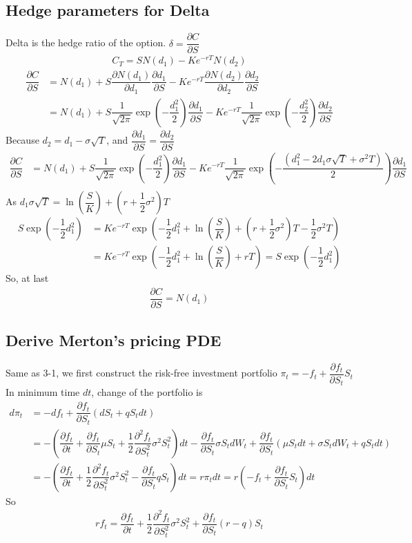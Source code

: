 \documentclass[12pt]{article}
\newcommand{\pfpt}{\dfrac{\partial f_t}{\partial t}}
\newcommand{\pfps}{\dfrac{\partial f_t}{\partial S_t}}
\newcommand{\pffpss}{\dfrac{\partial^2 f_t}{\partial S_t^2}}
\begin{document}
\subsection*{Hedge parameters for Delta}
Delta is the hedge ratio of the option. $\delta = \dfrac{\partial C}{\partial S}$
\begin{align*}
    C_T = S N(d_1) - Ke^{-rT}N(d_2) 
\end{align*}
\begin{align*}
    \dfrac{\partial C}{\partial S} & = N(d_1) + S\dfrac{\partial N(d_1)}{\partial d_1}\dfrac{\partial d_1}{\partial S} - Ke^{-rT}\dfrac{\partial N(d_2)}{\partial d_2}\dfrac{\partial d_2}{\partial S}\\
    & = N(d_1) + S\dfrac{1}{\sqrt{2\pi}}\exp(-\dfrac{d_1^2}{2})\dfrac{\partial d_1}{\partial S} - Ke^{-rT}\dfrac{1}{\sqrt{2\pi}}\exp(-\dfrac{d_2^2}{2})\dfrac{\partial d_2}{\partial S}
\end{align*}
Because $d_2 = d_1 - \sigma\sqrt{T}$, and $\dfrac{\partial d_1}{\partial S} = \dfrac{\partial d_2}{\partial S}$
\begin{align*}
    \dfrac{\partial C}{\partial S} & = N(d_1) + S\dfrac{1}{\sqrt{2\pi}}\exp(-\dfrac{d_1^2}{2})\dfrac{\partial d_1}{\partial S} - Ke^{-rT}\dfrac{1}{\sqrt{2\pi}}\exp(-\dfrac{(d_1^2 - 2d_1 \sigma\sqrt{T} + \sigma^2 T)}{2})\dfrac{\partial d_1}{\partial S}\\
\end{align*}
As $d_1\sigma\sqrt{T} = \ln(\dfrac{S}{K})+(r+\dfrac{1}{2}\sigma^2)T$
\begin{align*}
    S\exp(-\dfrac{1}{2}d_1^2) &= Ke^{-rT}\exp(-\dfrac{1}{2}d_1^2 + \ln(\dfrac{S}{K})+(r+\dfrac{1}{2}\sigma^2)T - \dfrac{1}{2}\sigma^2T)\\
    & = Ke^{-rT}\exp(-\dfrac{1}{2}d_1^2 + \ln(\dfrac{S}{K}) + rT) = S\exp(-\dfrac{1}{2}d_1^2)
\end{align*}
So, at last
\begin{align*}
    \dfrac{\partial C}{\partial S} = N(d_1)
\end{align*}
\subsection*{Derive Merton's pricing PDE}
Same as 3-1, we first construct the risk-free investment portfolio $\pi_t = -f_t + \dfrac{\partial f_t}{\partial S_t}S_t$\\
In minimum time $dt$, change of the portfolio is
\begin{align*}
    d\pi_t & = -df_t + \dfrac{\partial f_t}{\partial S_t}(dS_t + qS_t dt)\\
    & = -\left(\pfpt + \pfps \mu S_t + \dfrac{1}{2}\pffpss \sigma^2 S_t^2\right)dt - \pfps \sigma S_tdW_t + \pfps (\mu S_t dt + \sigma S_t dW_t + qS_t dt)\\
    & = -\left(\pfpt + \dfrac{1}{2}\pffpss \sigma^2 S_t^2 - \pfps qS_t\right)dt = r\pi_t dt = r\left(-f_t + \dfrac{\partial f_t}{\partial S_t}S_t\right)dt
\end{align*}
So
\begin{align*}
    rf_t = \pfpt + \dfrac{1}{2}\pffpss \sigma^2 S_t^2 + \pfps (r-q)S_t
\end{align*}
\end{document}
